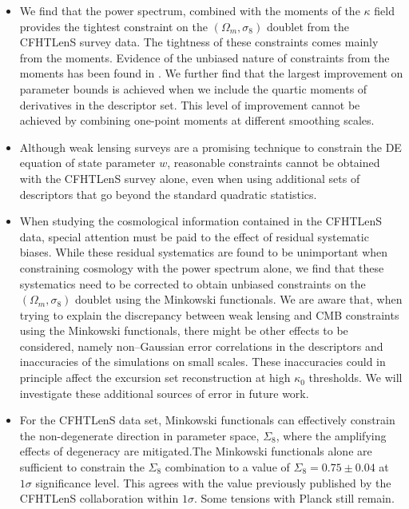 \documentclass[reprint,aps,prd,superscriptaddress,showkeys,showpacs]{revtex4-1}
\begin{document}
\begin{itemize}

\item We find that the power spectrum, combined with the moments of
  the $\kappa$ field provides the tightest constraint on the
  $(\Omega_m,\sigma_8)$ doublet from the CFHTLenS survey data. The
  tightness of these constraints comes mainly from the
  moments. Evidence of the unbiased nature of constraints from the
  moments has been found in \citep{PetriSpurious}. We further find
  that the largest improvement on parameter bounds is achieved when we
  include the quartic moments of derivatives in the descriptor set. This
  level of improvement cannot be achieved by combining one-point
  moments at different smoothing scales.

\item Although weak lensing surveys are a promising technique to
  constrain the DE equation of state parameter $w$, reasonable
  constraints cannot be obtained with the CFHTLenS survey alone, even
  when using additional sets of descriptors that go beyond the
  standard quadratic statistics.

\item When studying the cosmological information contained in the
  CFHTLenS data, special attention must be paid to the effect of
  residual systematic biases. While these residual systematics are
  found to be unimportant when constraining cosmology with the power
  spectrum alone, we find that these systematics need to be corrected
  to obtain unbiased constraints on the $(\Omega_m,\sigma_8)$ doublet
  using the Minkowski functionals. We are aware that, when trying to explain the discrepancy between weak lensing and CMB constraints using the Minkowski functionals, there might be other effects to be considered, namely non--Gaussian error correlations in the descriptors and inaccuracies of the simulations on small scales. These inaccuracies could in principle affect the excursion set reconstruction at high $\kappa_0$ thresholds. We will investigate these additional sources of error in future work.

\item For the CFHTLenS data set, Minkowski functionals can effectively
  constrain the non-degenerate direction in parameter space,
  $\Sigma_8$, where the amplifying effects of degeneracy are
  mitigated.The Minkowski functionals alone are sufficient to
  constrain the $\Sigma_8$ combination to a value of
  $\Sigma_8=0.75\pm0.04$ at $1\sigma$ significance level. This agrees
  with the value previously published by the CFHTLenS collaboration
  within $1\sigma$. Some tensions with Planck \citep{PlanckXVI2013}
  still remain.

\end{itemize}
\end{document}
